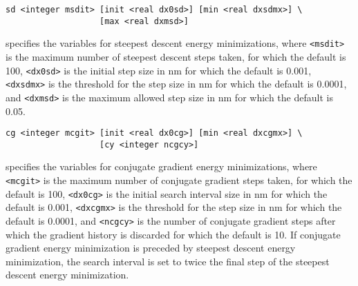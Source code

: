 \begin{description}
\item
\begin{verbatim}
sd <integer msdit> [init <real dx0sd>] [min <real dxsdmx>] \
                   [max <real dxmsd>] 
\end{verbatim}
specifies the variables for steepest descent energy minimizations,
where \verb+<msdit>+ is the maximum number of steepest descent steps taken,
for which the default is 100, \verb+<dx0sd>+ is the initial step size in nm
for which the default is 0.001, \verb+<dxsdmx>+ is the threshold for the
step size in nm for which the default is 0.0001, and \verb+<dxmsd>+ is the
maximum allowed step size in nm for which the default is 0.05.
\item
\begin{verbatim}
cg <integer mcgit> [init <real dx0cg>] [min <real dxcgmx>] \
                   [cy <integer ncgcy>]
\end{verbatim}
specifies the variables for conjugate gradient energy minimizations,
where \verb+<mcgit>+ is the maximum number of conjugate gradient steps 
taken, for which the default is 100, \verb+<dx0cg>+ is the initial search
interval size in nm for which the default is 0.001, \verb+<dxcgmx>+ is the 
threshold for the step size in nm for which the default is 0.0001, and 
\verb+<ncgcy>+ is the number of conjugate gradient steps after which the 
gradient history is discarded for which the default is 10. If conjugate
gradient energy minimization is preceded by steepest descent energy 
minimization, the search interval is set to twice the final step of the
steepest descent energy minimization.
\end{description}

